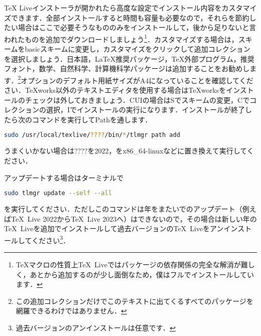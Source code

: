 TeX Liveインストーラが開かれたら高度な設定でインストール内容をカスタマイズできます．全部インストールすると時間も容量も必要なので，それらを節約したい場合はここで必要そうなもののみをインストールして，後から足りないと言われたものを追加でダウンロードしましょう\footnote{\TeX マクロの性質上\TeX\ Liveではパッケージの依存関係の完全な解消が難しく，あとから追加するのが少し面倒なため，僕はフルでインストールしています．}．カスタマイズする場合は，スキームをbasicスキームに変更し，カスタマイズをクリックして追加コレクションを選択しましょう．日本語，LaTeX推奨パッケージ，TeX外部プログラム，推奨フォント，数学、自然科学、計算機科学パッケージは追加することをお勧めします．\footnote{この追加コレクションだけでこのテキストに出てくるすべてのパッケージを網羅できるわけではありません．}オプションのデフォルト用紙サイズがA4になっていることを確認してください．TeXworks以外のテキストエディタを使用する場合はTeXworksをインストールのチェックは外しておきましょう．CUIの場合はSでスキームの変更，Cでコレクションの選択，Iでインストールの実行になります．インストールが終了したら次のコマンドを実行してPathを通します．
\begin{lstlisting}[language=bash]
sudo /usr/local/texlive/????/bin/*/tlmgr path add
\end{lstlisting}
うまくいかない場合は????を2022，\textasteriskcentered をx86\_64-linuxなどに置き換えて実行してください．

アップデートする場合はターミナルで
\begin{lstlisting}[language=bash]
sudo tlmgr update --self --all
\end{lstlisting}
を実行してください．ただしこのコマンドは年をまたいでのアップデート（例えば\TeX\ Live 2022から\TeX\ Live 2023へ）はできないので，その場合は新しい年の\TeX\ Liveを追加でインストールして過去バージョンの\TeX\ Liveをアンインストールしてください\footnote{過去バージョンのアンインストールは任意です．}．